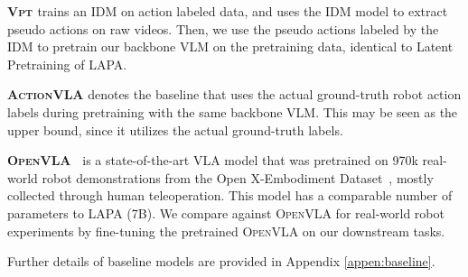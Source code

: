 \documentclass{article} %
\begin{document}
\textbf{\textsc{Vpt} \citep{NEURIPS2022_9c7008af}} trains an IDM on action labeled data, and uses the IDM model to extract pseudo actions on raw videos.
Then, we use the pseudo actions labeled by the IDM to pretrain our backbone VLM on the pretraining data, identical to Latent Pretraining of LAPA.

\textbf{\textsc{ActionVLA}} denotes the baseline that uses the actual ground-truth robot action labels during pretraining with the same backbone VLM. 
This may be seen as the upper bound, since it utilizes the actual ground-truth labels. 

\textbf{\textsc{OpenVLA}~\citep{kim2024OpenVLA}} is a state-of-the-art VLA model that was pretrained on 970k real-world robot demonstrations from the Open X-Embodiment Dataset~\citep{open_x_embodiment_rt_x_2023}, mostly collected through human teleoperation. This model has a comparable number of parameters to LAPA (7B).
We compare against \textsc{OpenVLA} for real-world robot experiments by fine-tuning the pretrained \textsc{OpenVLA} on our downstream tasks. 

Further details of baseline models are provided in Appendix \ref{appen:baseline}.


\end{document}
